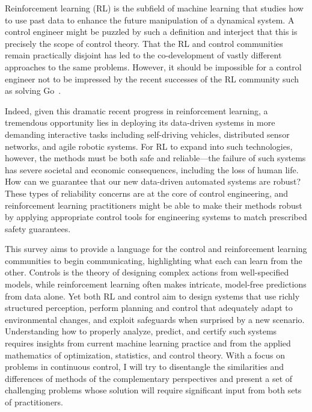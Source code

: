 \documentclass[11pt]{article}
\numberwithin{equation}{section}
\begin{document}
Reinforcement learning (RL) is the subfield of machine learning that studies how to use past data to enhance the future manipulation of a dynamical system. A control engineer might be puzzled by such a definition and interject that this is precisely the scope of control theory. That the RL and control communities remain practically disjoint has led to the co-development of vastly different approaches to the same problems. However, it should be impossible for a control engineer not to be impressed by the recent successes of the RL community such as solving Go~\cite{silver2016mastering}. 

Indeed, given this dramatic recent progress in reinforcement learning, a tremendous opportunity lies in deploying its data-driven systems in more demanding interactive tasks including self-driving vehicles, distributed sensor networks, and agile robotic systems.  For RL to expand into such technologies, however, the methods must be both safe and reliable---the failure of such systems has severe societal and economic consequences, including the loss of human life. How can we guarantee that our new data-driven automated systems are robust? These types of reliability concerns are at the core of  control engineering, and reinforcement learning practitioners might be able to make their methods robust by applying appropriate control tools for engineering systems to match prescribed safety guarantees.

This survey aims to provide a language for the control and reinforcement learning communities to begin communicating, highlighting what each can learn from the other. Controls is the theory of designing complex actions from well-specified models, while reinforcement learning often makes intricate, model-free predictions from data alone. Yet both RL and control aim to design systems that use richly structured perception, perform planning and control that adequately adapt to environmental changes, and exploit safeguards when surprised by a new scenario.  Understanding how to properly analyze, predict, and certify such systems requires insights from current machine learning practice and from the applied mathematics of optimization, statistics, and control theory.  With a focus on problems in continuous control, I will try to disentangle the similarities and differences of methods of the complementary perspectives and present a set of challenging problems whose solution will require significant input from both sets of practitioners.
\end{document}
